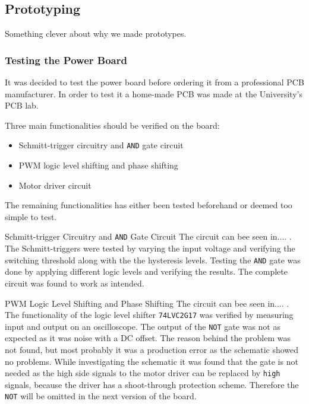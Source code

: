 \subsection{Prototyping}
\label{sub:controller_board_prototyping}
Something clever about why we made prototypes.


\subsubsection{Testing the Power Board}
It was decided to test the power board before ordering it from a professional PCB manufacturer.
In order to test it a home-made PCB was made at the University's PCB lab.

Three main functionalities should be verified on the board:

\begin{itemize}
	\item Schmitt-trigger circuitry and \texttt{AND} gate circuit
	\item PWM logic level shifting and phase shifting
	\item Motor driver circuit
\end{itemize}

The remaining functionalities has either been tested beforehand or deemed too simple to test. 

\par{Schmitt-trigger Circuitry and \texttt{AND} Gate Circuit}
The circuit can bee seen in.... .
The Schmitt-triggers were tested by varying the input voltage and verifying the switching threshold along with the the hysteresis levels. 
Testing the \texttt{AND} gate was done by applying different logic levels and verifying the results.
The complete circuit was found to work as intended.

\par{PWM Logic Level Shifting and Phase Shifting}
The circuit can bee seen in.... .
The functionality of the logic level shifter \texttt{74LVC2G17} was verified by measuring input and output on an oscilloscope. 
The output of the \texttt{NOT} gate was not as expected as it was noise with a DC offset. 
The reason behind the problem was not found, but most probably it was a production error as the schematic showed no problems.
While investigating the schematic it was found that the gate is not needed as the high side signals to the motor driver can be replaced by \texttt{high} signals, because the driver has a shoot-through protection scheme.
Therefore the \texttt{NOT} will be omitted in the next version of the board.

